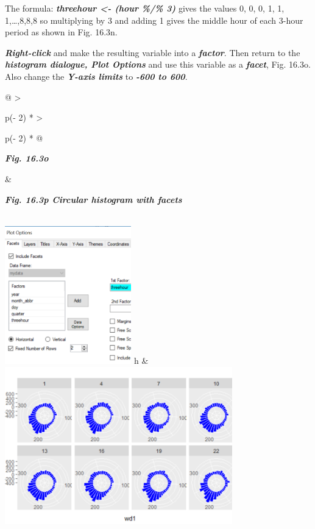 \documentclass[
  letterpaper,
  DIV=11,
  numbers=noendperiod]{scrreprt}
\begin{document}
The formula: \textbf{\emph{threehour \textless- (hour \%/\% 3)}} gives
the values 0, 0, 0, 1, 1, 1,\ldots,8,8,8 so multiplying by 3 and adding
1 gives the middle hour of each 3-hour period as shown in Fig. 16.3n.

\textbf{\emph{Right-click}} and make the resulting variable into a
\textbf{\emph{factor}}. Then return to the \textbf{\emph{histogram
dialogue, Plot Options}} and use this variable as a
\textbf{\emph{facet}}, Fig. 16.3o. Also change the \textbf{\emph{Y-axis
limits}} to \textbf{\emph{-600 to 600}}.

\begin{longtable}[]{@{}
  >{\raggedright\arraybackslash}p{(\columnwidth - 2\tabcolsep) * }
  >{\raggedright\arraybackslash}p{(\columnwidth - 2\tabcolsep) * }@{}}
\toprule\noalign{}
\begin{minipage}[b]{\linewidth}\raggedright
\textbf{\emph{Fig. 16.3o}}
\end{minipage} & \begin{minipage}[b]{\linewidth}\raggedright
\textbf{\emph{Fig. 16.3p Circular histogram with facets}}
\end{minipage} \\
\midrule\noalign{}
\endhead
\bottomrule\noalign{}
\endlastfoot
\includegraphics[width=2.16059in,height=2.35701in]{figures/Fig16.3o.png}
h &
\includegraphics[width=3.88977in,height=\textheight]{figures/Fig16.3p.png} \\
\end{longtable}
\end{document}
